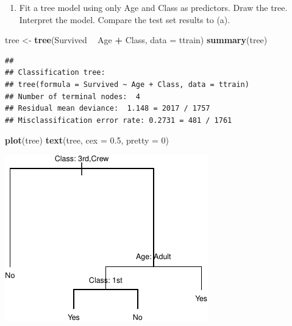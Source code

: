 \documentclass[]{article}
\newenvironment{Shaded}{\begin{snugshade}}{\end{snugshade}}
\newcommand{\DataTypeTok}[1]{\textcolor[rgb]{0.13,0.29,0.53}{#1}}
\newcommand{\DecValTok}[1]{\textcolor[rgb]{0.00,0.00,0.81}{#1}}
\newcommand{\FloatTok}[1]{\textcolor[rgb]{0.00,0.00,0.81}{#1}}
\newcommand{\KeywordTok}[1]{\textcolor[rgb]{0.13,0.29,0.53}{\textbf{#1}}}
\newcommand{\NormalTok}[1]{#1}
\newcommand{\OperatorTok}[1]{\textcolor[rgb]{0.81,0.36,0.00}{\textbf{#1}}}
\newcommand{\StringTok}[1]{\textcolor[rgb]{0.31,0.60,0.02}{#1}}
\providecommand{\tightlist}{%
  \setlength{\itemsep}{0pt}\setlength{\parskip}{0pt}}
\begin{document}
\begin{enumerate}
\def\labelenumi{(\alph{enumi})}
\setcounter{enumi}{2}
\tightlist
\item
  Fit a tree model using only Age and Class as predictors. Draw the
  tree. Interpret the model. Compare the test set results to (a).
\end{enumerate}

\begin{Shaded}
\begin{Highlighting}[]
\NormalTok{tree <-}\StringTok{ }\KeywordTok{tree}\NormalTok{(Survived }\OperatorTok{~}\StringTok{ }\NormalTok{Age }\OperatorTok{+}\StringTok{ }\NormalTok{Class, }\DataTypeTok{data =}\NormalTok{ ttrain)}
\KeywordTok{summary}\NormalTok{(tree)}
\end{Highlighting}
\end{Shaded}

\begin{verbatim}
## 
## Classification tree:
## tree(formula = Survived ~ Age + Class, data = ttrain)
## Number of terminal nodes:  4 
## Residual mean deviance:  1.148 = 2017 / 1757 
## Misclassification error rate: 0.2731 = 481 / 1761
\end{verbatim}

\begin{Shaded}
\begin{Highlighting}[]
\KeywordTok{plot}\NormalTok{(tree)}
\KeywordTok{text}\NormalTok{(tree, }\DataTypeTok{cex =} \FloatTok{0.5}\NormalTok{, }\DataTypeTok{pretty =} \DecValTok{0}\NormalTok{)}
\end{Highlighting}
\end{Shaded}

\begin{center}\includegraphics{sol_A4_files/figure-latex/unnamed-chunk-24-1} \end{center}
\end{document}
